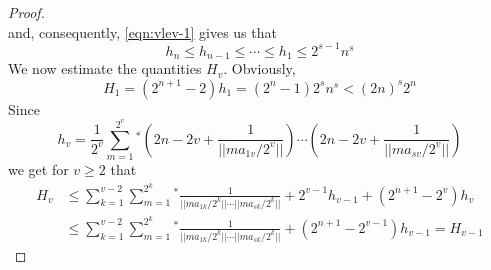 \documentclass[a4paper, 12pt]{article}
\begin{document}
\begin{proof}
\begin{equation*}
\end{equation*}
and, consequently, \ref{eqn:vlev-1} gives us that
\begin{equation*}
h_n \le h_{n-1} \le \cdots \le h_1 \le 2^{s-1}n^s
\end{equation*}
We now estimate the quantities $H_v$. Obviously,
\begin{equation*}
H_1=(2^{n+1}-2)h_1=(2^n-1)2^sn^s<(2n)^s2^n
\end{equation*}
Since
\begin{equation*}
h_v=\frac{1}{2^v}\sum_{m=1}^{2^v}{}^*\left(2n-2v+\frac{1}{||ma_{1v}/2^v||}\right)\cdots\left(2n-2v+\frac{1}{||ma_{sv}/2^v||}\right)\end{equation*}
we get for $v\ge2$ that
\begin{align*}
H_v &\le \sum_{k=1}^{v-2} \sum_{m=1}^{2^k} {}^*\frac{1}{||ma_{1k}/2^k|| \cdots ||ma_{sk}/2^k||}+2^{v-1}h_{v-1}+(2^{n+1}-2^v)h_v \\
&\le \sum_{k=1}^{v-2} \sum_{m=1}^{2^k} {}^*\frac{1}{||ma_{1k}/2^k|| \cdots ||ma_{sk}/2^k||}+(2^{n+1}-2^{v-1})h_{v-1}=H_{v-1}
\end{align*}


\end{proof}
\end{document}
